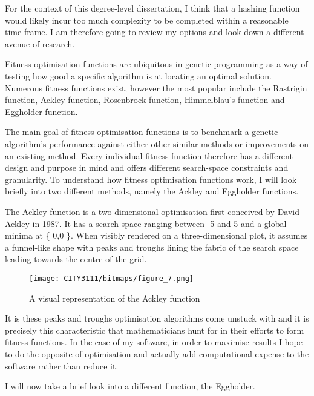 For the context of this degree-level dissertation, I think that a hashing function would likely incur too much complexity to be completed within a reasonable time-frame. I am therefore going to review my options and look down a different avenue of research.
\vfill\break

\textbf{}

Fitness optimisation functions are ubiquitous in genetic programming as a way of testing how good a specific algorithm is at locating an optimal solution. Numerous fitness functions exist, however the most popular include the Rastrigin function, Ackley function, Rosenbrock function, Himmelblau's function and Eggholder function.

The main goal of fitness optimisation functions is to benchmark a genetic algorithm's performance against either other similar methods or improvements on an existing method. Every individual fitness function therefore has a different design and purpose in mind and offers different search-space constraints and granularity. To understand how fitness optimisation functions work, I will look briefly into two different methods, namely the Ackley and Eggholder functions.

The Ackley function \cite{ackley_1987} is a two-dimensional optimisation first conceived by David Ackley in 1987. It has a search space ranging between -5 and 5 and a global minima at \{ 0,0 \}. When visibly rendered on a three-dimensional plot, it assumes a funnel-like shape with peaks and troughs lining the fabric of the search space leading towards the centre of the grid.

\begin{figure}[H]
    \texttt{[image: CITY3111/bitmaps/figure\_7.png]}
    \caption{A visual representation of the Ackley function \cite{surjanovic_2017}}
    \label{figure_7}
\end{figure}
\vfill\break

It is these peaks and troughs optimisation algorithms come unstuck with and it is precisely this characteristic that mathematicians hunt for in their efforts to form fitness functions. In the case of my software, in order to maximise results I hope to do the opposite of optimisation and actually add computational expense to the software rather than reduce it.

I will now take a brief look into a different function, the Eggholder.

